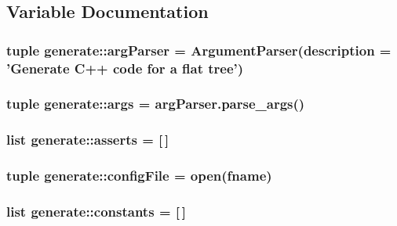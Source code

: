 \subsection{Variable Documentation}
\hypertarget{namespacegenerate_a3f7717cfb006e7c3ada549d16f167a4d}{
\subsubsection[{argParser}]{\setlength{\rightskip}{0pt plus 5cm}tuple {\bf generate::argParser} = ArgumentParser(description = 'Generate C++ code for a flat tree')}}
\label{namespacegenerate_a3f7717cfb006e7c3ada549d16f167a4d}
\hypertarget{namespacegenerate_a4544a52bc41de9176876934433956c40}{
\subsubsection[{args}]{\setlength{\rightskip}{0pt plus 5cm}tuple {\bf generate::args} = argParser.parse\_\-args()}}
\label{namespacegenerate_a4544a52bc41de9176876934433956c40}
\hypertarget{namespacegenerate_aefbfd43f8e4e5c8e7075b0ee816d5d96}{
\subsubsection[{asserts}]{\setlength{\rightskip}{0pt plus 5cm}list {\bf generate::asserts} = \mbox{[}$\,$\mbox{]}}}
\label{namespacegenerate_aefbfd43f8e4e5c8e7075b0ee816d5d96}
\hypertarget{namespacegenerate_abd696df6ed13678cc8e8e83b973865ca}{
\subsubsection[{configFile}]{\setlength{\rightskip}{0pt plus 5cm}tuple {\bf generate::configFile} = open(fname)}}
\label{namespacegenerate_abd696df6ed13678cc8e8e83b973865ca}
\hypertarget{namespacegenerate_ae15cb71cab91bceae5e3c231b1ef2288}{
\subsubsection[{constants}]{\setlength{\rightskip}{0pt plus 5cm}list {\bf generate::constants} = \mbox{[}$\,$\mbox{]}}}
